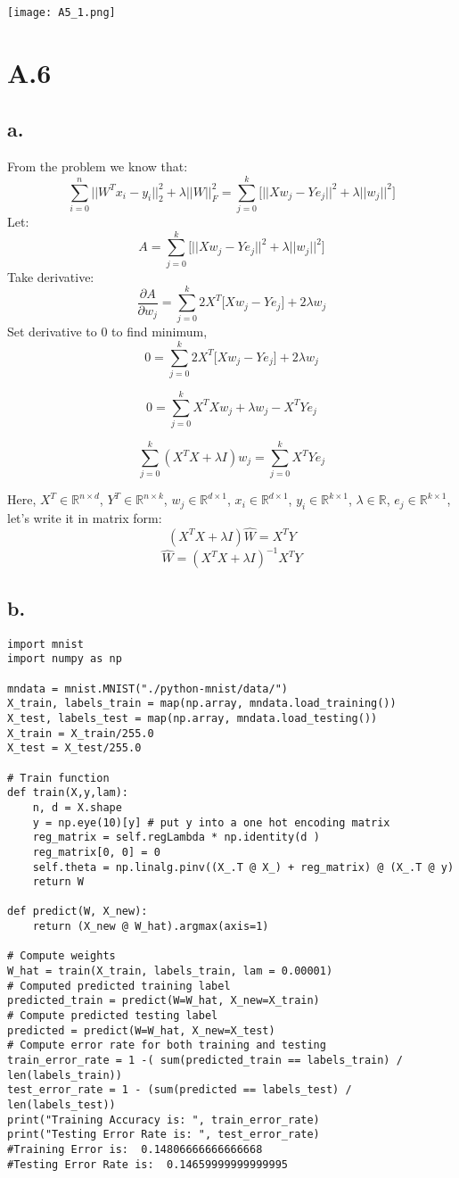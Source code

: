 \documentclass{article}
\begin{document}
\texttt{[image: A5\_1.png]}




\section*{A.6}

\subsection*{a.}
From the problem we know that:
\[ \sum_{i=0}^{n} || W^T x_i - y_i ||^2_2 + \lambda||W||^2_F = \sum_{j=0}^{k} \Big[ ||Xw_j - Ye_j||^2 + \lambda||w_j||^2\Big] \]
Let:
\[ A =  \sum_{j=0}^{k} \Big[ ||Xw_j - Ye_j||^2 + \lambda||w_j||^2\Big] \]
Take derivative:
\[   \frac{\partial A}{\partial w_j} = \sum_{j=0}^{k} 2X^T\big[ Xw_j - Ye_j \big] +2\lambda w_j \]
Set derivative to 0 to find minimum,
\[ 0 = \sum_{j=0}^{k} 2X^T\big[ Xw_j - Ye_j \big] +2\lambda w_j \]

\[ 0 = \sum_{j=0}^{k} X^TXw_j +\lambda w_j - X^TYe_j \]

\[ \sum_{j=0}^{k} (X^TX + \lambda I)w_j = \sum_{j=0}^{k} X^TYe_j\]


Here, $X^T \in \mathbb{R}^{n \times d}$, $Y^T \in \mathbb{R}^{n \times k}$, $w_j \in \mathbb{R}^{d \times 1}$, $x_i \in \mathbb{R}^{d \times 1}$, $y_i \in \mathbb{R}^{k \times 1}$, $\lambda \in \mathbb{R}$, $e_j \in \mathbb{R}^{k \times 1}$, let's write it in matrix form:
\[ (X^TX + \lambda I)\hat{W} = X^TY \]
\[ \hat{W} = (X^TX + \lambda I)^{-1}X^TY \]
\subsection*{b.}

\begin{verbatim}
import mnist
import numpy as np

mndata = mnist.MNIST("./python-mnist/data/")
X_train, labels_train = map(np.array, mndata.load_training()) 
X_test, labels_test = map(np.array, mndata.load_testing()) 
X_train = X_train/255.0
X_test = X_test/255.0

# Train function
def train(X,y,lam):
	n, d = X.shape
	y = np.eye(10)[y] # put y into a one hot encoding matrix
    reg_matrix = self.regLambda * np.identity(d )
    reg_matrix[0, 0] = 0
    self.theta = np.linalg.pinv((X_.T @ X_) + reg_matrix) @ (X_.T @ y)
	return W

def predict(W, X_new):    
	return (X_new @ W_hat).argmax(axis=1)

# Compute weights
W_hat = train(X_train, labels_train, lam = 0.00001)
# Computed predicted training label
predicted_train = predict(W=W_hat, X_new=X_train)
# Compute predicted testing label
predicted = predict(W=W_hat, X_new=X_test)
# Compute error rate for both training and testing
train_error_rate = 1 -( sum(predicted_train == labels_train) / len(labels_train))
test_error_rate = 1 - (sum(predicted == labels_test) / len(labels_test))
print("Training Accuracy is: ", train_error_rate)
print("Testing Error Rate is: ", test_error_rate)
#Training Error is:  0.14806666666666668
#Testing Error Rate is:  0.14659999999999995
\end{verbatim}
\end{document}
